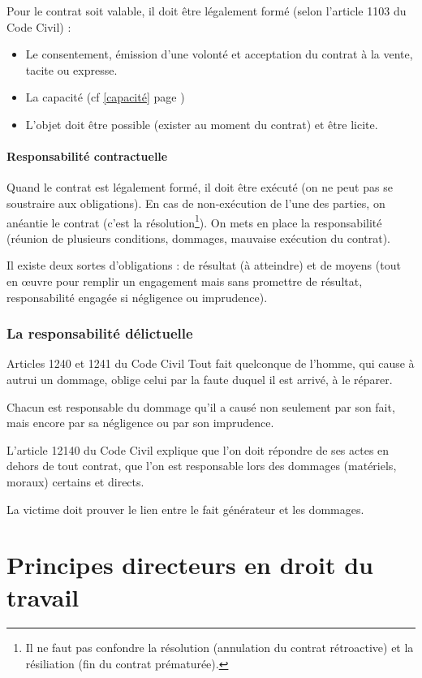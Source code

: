 \documentclass[10pt,a4paper]{article}
\begin{document}
Pour le contrat soit valable, il doit être légalement formé (selon l'article 1103 du Code Civil) :
\begin{itemize}
\item Le consentement, émission d'une volonté et acceptation du contrat à la vente, tacite ou expresse.
\item La capacité (cf \ref{capacité} page \pageref{capacité})
\item L'objet doit être possible (exister au moment du contrat) et être licite.
\end{itemize}

\subsection{Responsabilité contractuelle}

Quand le contrat est légalement formé, il doit être exécuté (on ne peut pas se soustraire aux obligations).
En cas de non-exécution de l'une des parties, on anéantie le contrat (c'est la résolution\footnote{Il ne faut pas confondre la résolution (annulation du contrat rétroactive) et la résiliation (fin du contrat prématurée).}).
On mets en place la responsabilité (réunion de plusieurs conditions, dommages, mauvaise exécution du contrat).

Il existe deux sortes d'obligations : de résultat (à atteindre) et de moyens (tout en œuvre pour remplir un engagement mais sans promettre de résultat, responsabilité engagée si négligence ou imprudence).

\section{La responsabilité délictuelle}

\begin{aquote}{Articles 1240 et 1241 du Code Civil}
Tout fait quelconque de l'homme, qui cause à autrui un dommage, oblige celui par la faute duquel il est arrivé, à le réparer.

Chacun est responsable du dommage qu'il a causé non seulement par son fait, mais encore par sa négligence ou par son imprudence.
\end{aquote}

L'article 12140 du Code Civil explique que l'on doit répondre de ses actes en dehors de tout contrat, que l'on est responsable lors des dommages (matériels, moraux) certains et directs.

La victime doit prouver le lien entre le fait générateur et les dommages.

\part{Principes directeurs en droit du travail}
\end{document}
